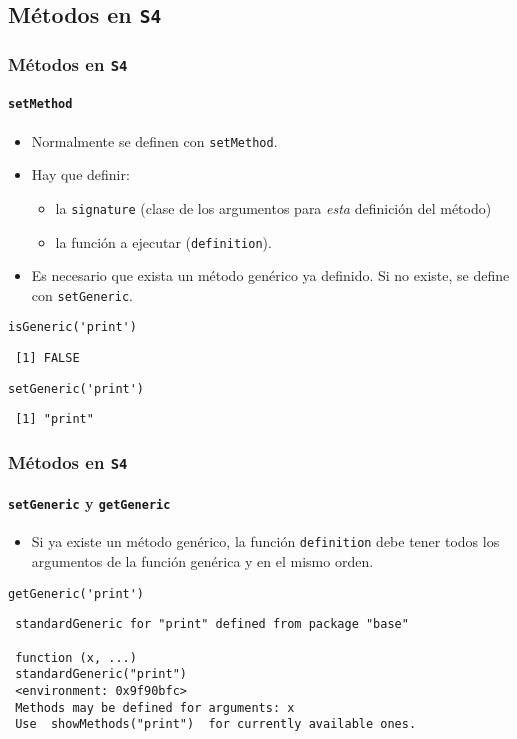 \documentclass[xcolor={usenames,svgnames,dvipsnames}]{beamer}
\begin{document}
\subsection{Métodos en \texttt{S4}}
\label{sec-3-2}
\begin{frame}[fragile]
\frametitle{Métodos en \texttt{S4}}
\framesubtitle{\texttt{setMethod}}
\label{sec-3-2-1}

\begin{itemize}
\item Normalmente se definen con \texttt{setMethod}.
\item Hay que definir:
\begin{itemize}
\item la \texttt{signature} (clase de los argumentos para \emph{esta} definición del
    método)
\item la función a ejecutar (\texttt{definition}).
\end{itemize}
\item Es necesario que exista un método genérico ya definido. Si no
  existe, se define con \texttt{setGeneric}.
\end{itemize}



\lstset{language=R}
\begin{lstlisting}
isGeneric('print')
\end{lstlisting}

\begin{verbatim}
 [1] FALSE
\end{verbatim}


\lstset{language=R}
\begin{lstlisting}
setGeneric('print')
\end{lstlisting}

\begin{verbatim}
 [1] "print"
\end{verbatim}
\end{frame}
\begin{frame}[fragile]
\frametitle{Métodos en \texttt{S4}}
\framesubtitle{\texttt{setGeneric} y \texttt{getGeneric}}
\label{sec-3-2-2}

\begin{itemize}
\item Si ya existe un método genérico, la función \texttt{definition} debe tener
  todos los argumentos de la función genérica y en el mismo orden.
\end{itemize}

\lstset{language=R}
\begin{lstlisting}
getGeneric('print')
\end{lstlisting}

\begin{verbatim}
 standardGeneric for "print" defined from package "base"
 
 function (x, ...) 
 standardGeneric("print")
 <environment: 0x9f90bfc>
 Methods may be defined for arguments: x
 Use  showMethods("print")  for currently available ones.
\end{verbatim}
\end{frame}
\end{document}
